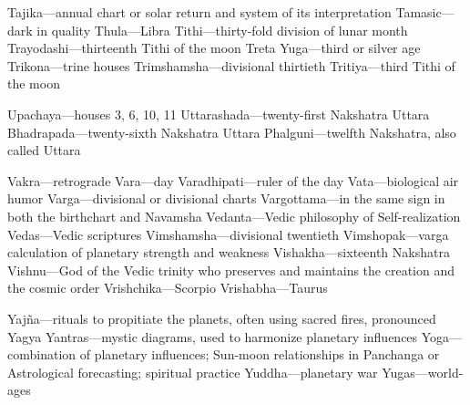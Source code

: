 Tajika—annual chart or solar return and system of its interpretation Tamasic—dark in quality Thula—Libra Tithi—thirty-fold division of lunar month Trayodashi—thirteenth Tithi of the moon Treta Yuga—third or silver age Trikona—trine houses Trimshamsha—divisional thirtieth Tritiya—third Tithi of the moon  

Upachaya—houses 3, 6, 10, 11 Uttarashada—twenty-first Nakshatra Uttara Bhadrapada—twenty-sixth Nakshatra Uttara Phalguni—twelfth Nakshatra, also called Uttara  

Vakra—retrograde Vara—day Varadhipati—ruler of the day Vata—biological air humor Varga—divisional or divisional charts Vargottama—in the same sign in both the birthchart and Navamsha Vedanta—Vedic philosophy of Self-realization Vedas—Vedic scriptures Vimshamsha—divisional twentieth Vimshopak—varga calculation of planetary strength and weakness Vishakha—sixteenth Nakshatra Vishnu—God of the Vedic trinity who preserves and maintains the creation and the cosmic order Vrishchika—Scorpio Vrishabha—Taurus  

Yajña—rituals to propitiate the planets, often using sacred fires, pronounced Yagya Yantras—mystic diagrams, used to harmonize planetary influences Yoga—combination of planetary influences; Sun-moon relationships in Panchanga or Astrological forecasting; spiritual practice Yuddha—planetary war Yugas—world-ages    

